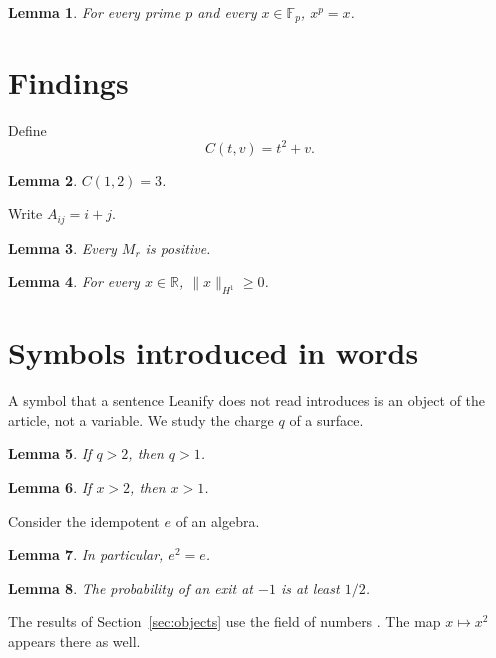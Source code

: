 \documentclass{article}
\let\oldmapsto\mapsto
\renewcommand{\mapsto}{\mathrel{\oldmapsto}}
\newtheorem{lemma}{Lemma}
\begin{document}
\begin{lemma}\label{finite-field}
For every prime $p$ and every $x\in\mathbb F_p$, $x^p=x$.
\end{lemma}

\section{Findings}

Define \[C(t,v)=t^2+v.\]

\begin{lemma}\label{function-without-binder}
$C(1,2)=3$.
\end{lemma}

Write $A_{ij}=i+j$.

\begin{lemma}\label{no-noun}
Every $M_r$ is positive.
\end{lemma}

\begin{lemma}\label{other-norm}
For every $x\in\mathbb R$, $\|x\|_{H^1}\ge0$.
\end{lemma}

\section{Symbols introduced in words}

A symbol that a sentence Leanify does not read introduces is an object of the article,
not a variable. We study the charge $q$ of a surface.

\begin{lemma}\label{introduced}
If $q>2$, then $q>1$.
\end{lemma}

\begin{lemma}\label{fresh}
If $x>2$, then $x>1$.
\end{lemma}

Consider the idempotent $e$ of an algebra.

\begin{lemma}\label{euler}
In particular, $e^2=e$.
\end{lemma}

\begin{lemma}\label{apposition}
The probability of an exit at $-1$ is at least $1/2$.
\end{lemma}

The results of Section~\ref*{sec:objects} use the field of numbers
\cite[Section~2.1 and
Lemma~3]
{numbers}. The map $x\mapsto x^2$ appears there as well.
\end{document}
